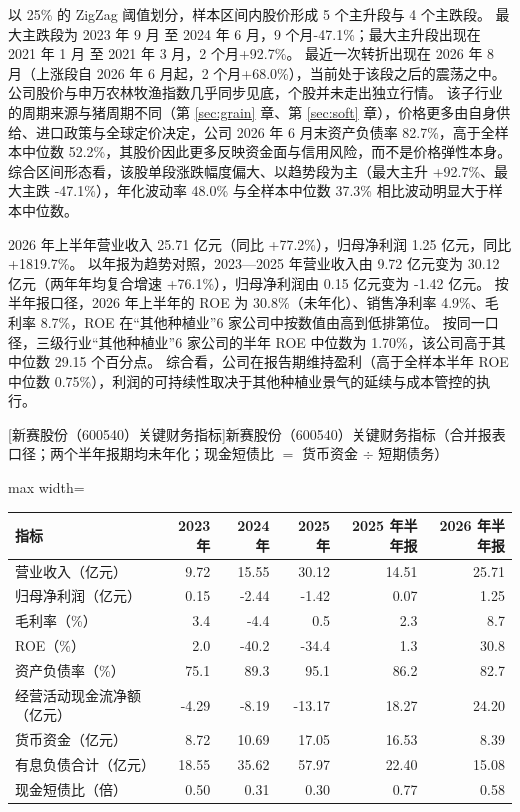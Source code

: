  以 25\% 的 ZigZag 阈值划分，样本区间内股价形成 5 个主升段与 4 个主跌段。 最大主跌段为 2023 年 9 月 至 2024 年 6 月，9 个月-47.1\%；最大主升段出现在 2021 年 1 月 至 2021 年 3 月，2 个月+92.7\%。 最近一次转折出现在 2026 年 8 月（上涨段自 2026 年 6 月起，2 个月+68.0\%），当前处于该段之后的震荡之中。 公司股价与申万农林牧渔指数几乎同步见底，个股并未走出独立行情。 该子行业的周期来源与猪周期不同（第 \ref{sec:grain} 章、第 \ref{sec:soft} 章），价格更多由自身供给、进口政策与全球定价决定，公司 2026 年 6 月末资产负债率 82.7\%，高于全样本中位数 52.2\%，其股价因此更多反映资金面与信用风险，而不是价格弹性本身。 综合区间形态看，该股单段涨跌幅度偏大、以趋势段为主（最大主升 +92.7\%、最大主跌 -47.1\%），年化波动率 48.0\% 与全样本中位数 37.3\% 相比波动明显大于样本中位数。

 2026 年上半年营业收入 25.71 亿元（同比 +77.2\%），归母净利润 1.25 亿元，同比 +1819.7\%。 以年报为趋势对照，2023---2025 年营业收入由 9.72 亿元变为 30.12 亿元（两年年均复合增速 +76.1\%），归母净利润由 0.15 亿元变为 -1.42 亿元。 按半年报口径，2026 年上半年的 ROE 为 30.8\%（未年化）、销售净利率 4.9\%、毛利率 8.7\%，ROE 在“其他种植业”6 家公司中按数值由高到低排第位。 按同一口径，三级行业“其他种植业”6 家公司的半年 ROE 中位数为 1.70\%，该公司高于其中位数 29.15 个百分点。 综合看，公司在报告期维持盈利（高于全样本半年 ROE 中位数 0.75\%），利润的可持续性取决于其他种植业景气的延续与成本管控的执行。

\begin{center}\small\setlength{\tabcolsep}{3.4pt}
[新赛股份（600540）关键财务指标]{新赛股份（600540）关键财务指标（合并报表口径；两个半年报期均未年化；现金短债比 $=$ 货币资金 $\div$ 短期债务）}
\begin{adjustbox}{max width=\textwidth}
\begin{tabular}{@{}lrrrrr@{}}
\toprule
指标 & 2023 年 & 2024 年 & 2025 年 & 2025 年半年报 & 2026 年半年报 \\
\midrule
营业收入（亿元） & 9.72 & 15.55 & 30.12 & 14.51 & 25.71 \\
归母净利润（亿元） & 0.15 & -2.44 & -1.42 & 0.07 & 1.25 \\
毛利率（\%） & 3.4 & -4.4 & 0.5 & 2.3 & 8.7 \\
ROE（\%） & 2.0 & -40.2 & -34.4 & 1.3 & 30.8 \\
资产负债率（\%） & 75.1 & 89.3 & 95.1 & 86.2 & 82.7 \\
经营活动现金流净额（亿元） & -4.29 & -8.19 & -13.17 & 18.27 & 24.20 \\
货币资金（亿元） & 8.72 & 10.69 & 17.05 & 16.53 & 8.39 \\
有息负债合计（亿元） & 18.55 & 35.62 & 57.97 & 22.40 & 15.08 \\
现金短债比（倍） & 0.50 & 0.31 & 0.30 & 0.77 & 0.58 \\
\bottomrule
\end{tabular}
\end{adjustbox}
\end{center}

